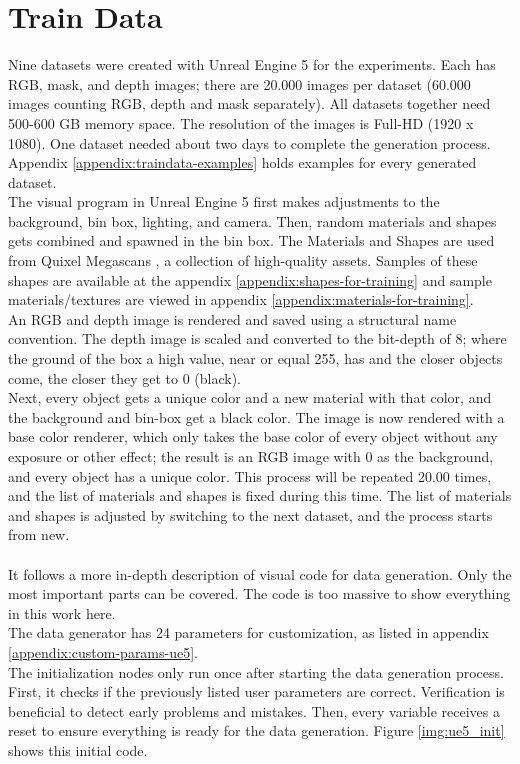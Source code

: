 	\section{Train Data}
	\label{sec:data}
		Nine datasets were created with Unreal Engine 5 \cite{ue5} for the experiments. Each has RGB, mask, and depth images; there are 20.000 images per dataset (60.000 images counting RGB, depth and mask separately). All datasets together need 500-600 GB memory space. The resolution of the images is Full-HD (1920 x 1080). One dataset needed about two days to complete the generation process. Appendix \ref{appendix:traindata-examples} holds examples for every generated dataset.\\
		The visual program in Unreal Engine 5 first makes adjustments to the background, bin box, lighting, and camera. Then, random materials and shapes gets combined and spawned in the bin box. The Materials and Shapes are used from Quixel Megascans \cite{Quixel}, a collection of high-quality assets. Samples of these shapes are available at the appendix \ref{appendix:shapes-for-training} and sample materials/textures are viewed in appendix \ref{appendix:materials-for-training}.\\
		An RGB and depth image is rendered and saved using a structural name convention. The depth image is scaled and converted to the bit-depth of 8; where the ground of the box a high value, near or equal 255, has and the closer objects come, the closer they get to 0 (black).\\
		Next, every object gets a unique color and a new material with that color, and the background and bin-box get a black color. The image is now rendered with a base color renderer, which only takes the base color of every object without any exposure or other effect; the result is an RGB image with 0 as the background, and every object has a unique color. This process will be repeated 20.00 times, and the list of materials and shapes is fixed during this time. The list of materials and shapes is adjusted by switching to the next dataset, and the process starts from new.\\
		\\
		It follows a more in-depth description of visual code for data generation. Only the most important parts can be covered. The code is too massive to show everything in this work here.\\
		The data generator has 24 parameters for customization, as listed in appendix \ref{appendix:custom-params-ue5}.\\
		The initialization nodes only run once after starting the data generation process. First, it checks if the previously listed user parameters are correct. Verification is beneficial to detect early problems and mistakes. Then, every variable receives a reset to ensure everything is ready for the data generation. Figure \ref{img:ue5_init} shows this initial code.
		
